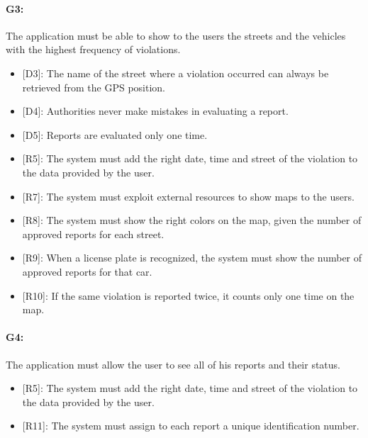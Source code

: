 \documentclass[12pt,a4paper]{report}
\begin{document}
			\paragraph {G3:} The application must be able to show to the users the streets and the vehicles with the highest frequency of violations.
			\begin{itemize}
				\item{[D3]}: The name of the street where a violation occurred can always be retrieved from the GPS position.
				\item{[D4]}: Authorities never make mistakes in evaluating a report.
				\item{[D5]}: Reports are evaluated only one time.
			\end{itemize}
			\begin{itemize}
				\item{[R5]}: The system must add the right date, time and street of the violation to the data provided by the user.
				\item{[R7]}: The system must exploit external resources to show maps to the users.
				\item{[R8]}: The system must show the right colors on the map, given the number of approved reports for each street.
				\item{[R9]}: When a license plate is recognized, the system must show the number of approved reports for that car.
				\item{[R10]}: If the same violation is reported twice, it counts only one time on the map.
			\end{itemize}
				\paragraph {G4:}  The application must allow the user to see all of his reports and their status.
			\begin{itemize}
				\item{[R5]}: The system must add the right date, time and street of the violation to the data provided by the user.
				\item{[R11]}: The system must assign to each report a unique identification number.
			\end{itemize}
\end{document}
